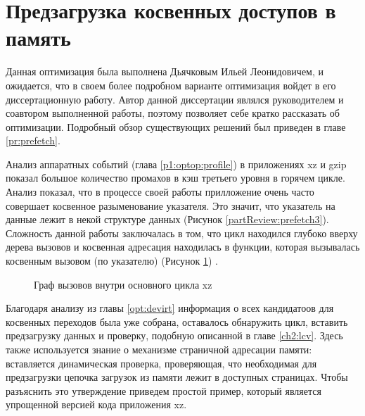 \section{Предзагрузка косвенных доступов в память} \label{opt:prefetch}
Данная оптимизация была выполнена Дьячковым Ильей Леонидовичем, и ожидается, что в своем более подробном варианте оптимизация войдет в его диссертационную работу.  Автор данной диссертации являлся руководителем и соавтором выполненной работы, поэтому позволяет себе кратко рассказать  об оптимизации.  Подробный обзор существующих решений был приведен в главе \ref{pr:prefetch}. 

Анализ аппаратных событий (глава \ref{p1:optop:profile}) в приложениях xz и gzip показал большое количество промахов в кэш третьего уровня в горячем цикле. Анализ показал, что в процессе своей работы прилложение очень часто совершает косвенное разыменование указателя. Это значит, что указатель на данные лежит в некой структуре данных (Рисунок \ref{partReview:prefetch3}). Сложность данной работы заключалась в том, что цикл находился глубоко вверху дерева вызовов и косвенная адресация находилась в функции, которая вызывалась косвенным вызовом (по указателю) (Рисунок \ref{optpref1}) \cite{E240105}. 
\begin{figure}[htbp]
	\centering
	
	\caption{Граф вызовов внутри основного цикла xz}
	\label{optpref1}
\end{figure}
Благодаря анализу из главы \ref{opt:devirt} информация о всех кандидатоов для косвенных переходов была уже собрана, оставалось обнаружить цикл, вставить предзагрузку данных и проверку, подобную описанной в главе \ref{ch2:lcv}. Здесь также используется знание о механизме страничной адресации памяти: вставляется динамическая проверка, проверяющая, что необходимая для предзагрузки цепочка загрузок из памяти лежит в доступных страницах. Чтобы разъяснить это утверждение приведем простой пример, который является упрощенной версией кода приложения xz.

 

